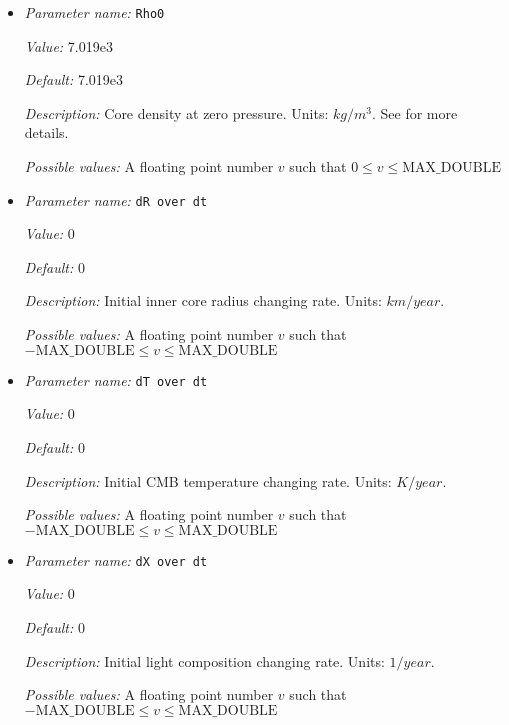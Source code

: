\begin{itemize}
{\it Default:} -27.7e6


{\it Description:} The heat of reaction. Units: $J/kg$.


{\it Possible values:} A floating point number $v$ such that $-\text{MAX\_DOUBLE} \leq v \leq \text{MAX\_DOUBLE}$
\item {\it Parameter name:} {\tt Rho0}
\label{parameters:Boundary temperature model/Dynamic core/Rho0}
\label{parameters:Boundary_20temperature_20model/Dynamic_20core/Rho0}


{\it Value:} 7.019e3


{\it Default:} 7.019e3


{\it Description:} Core density at zero pressure. Units: $kg/m^3$. See \cite{NPB+04} for more details.


{\it Possible values:} A floating point number $v$ such that $0 \leq v \leq \text{MAX\_DOUBLE}$
\item {\it Parameter name:} {\tt dR over dt}
\label{parameters:Boundary temperature model/Dynamic core/dR over dt}
\label{parameters:Boundary_20temperature_20model/Dynamic_20core/dR_20over_20dt}


{\it Value:} 0


{\it Default:} 0


{\it Description:} Initial inner core radius changing rate. Units: $km/year$.


{\it Possible values:} A floating point number $v$ such that $-\text{MAX\_DOUBLE} \leq v \leq \text{MAX\_DOUBLE}$
\item {\it Parameter name:} {\tt dT over dt}
\label{parameters:Boundary temperature model/Dynamic core/dT over dt}
\label{parameters:Boundary_20temperature_20model/Dynamic_20core/dT_20over_20dt}


{\it Value:} 0


{\it Default:} 0


{\it Description:} Initial CMB temperature changing rate. Units: $K/year$.


{\it Possible values:} A floating point number $v$ such that $-\text{MAX\_DOUBLE} \leq v \leq \text{MAX\_DOUBLE}$
\item {\it Parameter name:} {\tt dX over dt}
\label{parameters:Boundary temperature model/Dynamic core/dX over dt}
\label{parameters:Boundary_20temperature_20model/Dynamic_20core/dX_20over_20dt}


{\it Value:} 0


{\it Default:} 0


{\it Description:} Initial light composition changing rate. Units: $1/year$.


{\it Possible values:} A floating point number $v$ such that $-\text{MAX\_DOUBLE} \leq v \leq \text{MAX\_DOUBLE}$
\end{itemize}



